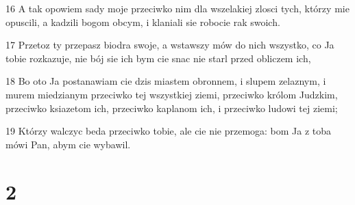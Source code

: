 \par 16 A tak opowiem sady moje przeciwko nim dla wszelakiej zlosci tych, którzy mie opuscili, a kadzili bogom obcym, i klaniali sie robocie rak swoich.
\par 17 Przetoz ty przepasz biodra swoje, a wstawszy mów do nich wszystko, co Ja tobie rozkazuje, nie bój sie ich bym cie snac nie starl przed obliczem ich,
\par 18 Bo oto Ja postanawiam cie dzis miastem obronnem, i slupem zelaznym, i murem miedzianym przeciwko tej wszystkiej ziemi, przeciwko królom Judzkim, przeciwko ksiazetom ich, przeciwko kaplanom ich, i przeciwko ludowi tej ziemi;
\par 19 Którzy walczyc beda przeciwko tobie, ale cie nie przemoga: bom Ja z toba mówi Pan, abym cie wybawil.

\chapter{2}

